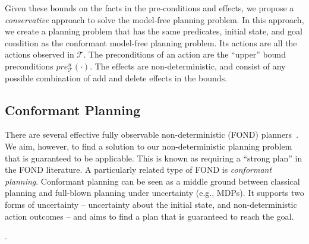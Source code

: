 \documentclass[letterpaper]{article}
\begin{document}
Given these bounds on the facts in the pre-conditions and effects, we propose a {\em conservative} approach to solve the model-free planning problem. In this approach, we create a planning problem that has the same predicates, initial state, and goal condition as the conformant model-free planning problem. Its actions are all the actions observed in $\mathcal{T}$. The preconditions of an action are the ``upper'' bound preconditions $pre_\mathcal{T}^u(\cdot)$. The effects are non-deterministic, and consist of any possible combination of add and delete effects in the bounds. 

\subsection{Conformant Planning}
There are several effective fully observable non-deterministic (FOND) planners~\cite{cimatti2003weak,kissmann2009solving}. We aim, however, to find a  solution to our non-deterministic planning problem that is guaranteed to be applicable. This is known as requiring a ``strong plan'' in the FOND literature. A particularly related type of FOND is {\em conformant planning}. Conformant planning can be seen as a middle ground between classical planning and full-blown planning under uncertainty (e.g., MDPs). It supports two forms of uncertainty -- uncertainty about the initial state, and non-deterministic action outcomes -- and aims to find a plan that is guaranteed to reach the goal.

. %




\end{document}
